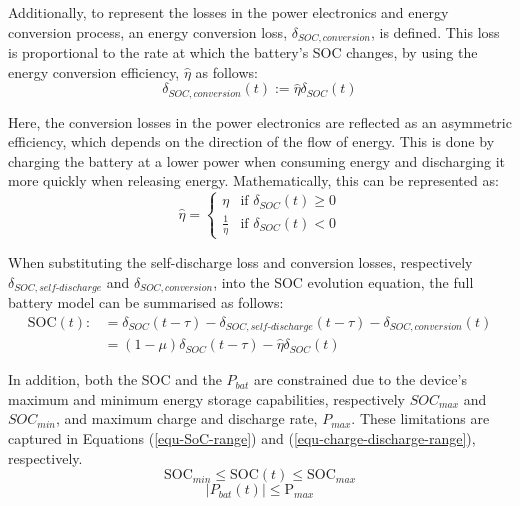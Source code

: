 Additionally, to represent the losses in the power electronics and energy conversion process, an energy conversion loss, $\delta_{SOC,conversion}$, is defined. This loss is proportional to the rate at which the battery's SOC changes, by using the energy conversion efficiency, $\hat{\eta}$ as follows:
\begin{equation}
	\delta_{SOC,conversion}(t) := \hat{\eta}\delta_{SOC}(t)
\end{equation}

Here, the conversion losses in the power electronics are reflected as an asymmetric efficiency, which depends on the direction of the flow of energy. This is done by charging the battery at a lower power when consuming energy and discharging it more quickly when releasing energy. Mathematically, this can be represented as:
\begin{equation}
\hat{\eta} =
	\begin{cases}
		\eta &\text{if } \delta_{SOC}(t) \geq 0 \\
		\frac{1}{\eta} &\text{if } \delta_{SOC}(t) < 0
	\end{cases}
\end{equation}

When substituting the self-discharge loss and conversion losses, respectively $\delta_{SOC,self\text{-}discharge}$ and $\delta_{SOC,conversion}$, into the SOC evolution equation, the full battery model can be summarised as follows:
\begin{equation}
\begin{split}
	\text{SOC}(t) :&= \delta_{SOC}(t-\tau) - \delta_{SOC,self\text{-}discharge}(t-\tau) - \delta_{SOC,conversion}(t)\\
	&= (1-\mu)\delta_{SOC}(t-\tau) - \hat{\eta}\delta_{SOC}(t)	
\end{split}
\end{equation}

In addition, both the SOC and the $P_{bat}$ are constrained due to the device's maximum and minimum energy storage capabilities, respectively $SOC_{max}$ and $SOC_{min}$, and maximum charge and discharge rate, $P_{max}$. These limitations are captured in Equations (\ref{equ-SoC-range}) and (\ref{equ-charge-discharge-range}), respectively.
\begin{equation}
\text{SOC}_{min} \leq \text{SOC}(t) \leq \text{SOC}_{max}
\label{equ-SoC-range}
\end{equation}
\begin{equation}
\left|P_{bat}(t)\right| \leq \text{P}_{max}
\label{equ-charge-discharge-range}
\end{equation}

